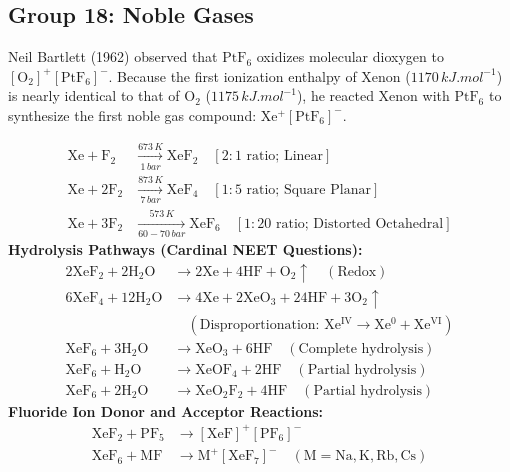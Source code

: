 \documentclass[10pt,twoside,openright]{book}
\begin{document}
\subsection{Group 18: Noble Gases}
Neil Bartlett (1962) observed that $\mathrm{PtF_6}$ oxidizes molecular dioxygen to $[\mathrm{O_2}]^+[\mathrm{PtF_6}]^-$. Because the first ionization enthalpy of Xenon ($1170\,\si{kJ.mol^{-1}}$) is nearly identical to that of $\mathrm{O_2}$ ($1175\,\si{kJ.mol^{-1}}$), he reacted Xenon with $\mathrm{PtF_6}$ to synthesize the first noble gas compound: $\mathrm{Xe^+[PtF_6]^-}$.

\begin{formulabox}
\begin{align}
  \mathrm{Xe} + \mathrm{F_2} &\xrightarrow[1\,\si{bar}]{673\,\si{K}} \mathrm{XeF_2} \quad [2:1\text{ ratio; Linear}] \\
  \mathrm{Xe} + 2\mathrm{F_2} &\xrightarrow[7\,\si{bar}]{873\,\si{K}} \mathrm{XeF_4} \quad [1:5\text{ ratio; Square Planar}] \\
  \mathrm{Xe} + 3\mathrm{F_2} &\xrightarrow[60-70\,\si{bar}]{573\,\si{K}} \mathrm{XeF_6} \quad [1:20\text{ ratio; Distorted Octahedral}]
\end{align}
\textbf{Hydrolysis Pathways (Cardinal NEET Questions):}
\begin{align}
  2\mathrm{XeF_2} + 2\mathrm{H_2O} &\longrightarrow 2\mathrm{Xe} + 4\mathrm{HF} + \mathbf{\mathrm{O_2\uparrow}} \quad (\text{Redox}) \\
  6\mathrm{XeF_4} + 12\mathrm{H_2O} &\longrightarrow 4\mathrm{Xe} + 2\mathbf{\mathrm{XeO_3}} + 24\mathrm{HF} + 3\mathbf{\mathrm{O_2\uparrow}} \\
  &\quad (\text{Disproportionation: } \mathrm{Xe^{IV}} \to \mathrm{Xe^0 + Xe^{VI}}) \\
  \mathrm{XeF_6} + 3\mathrm{H_2O} &\longrightarrow \mathbf{\mathrm{XeO_3}} + 6\mathrm{HF} \quad (\text{Complete hydrolysis}) \\
  \mathrm{XeF_6} + \mathrm{H_2O} &\longrightarrow \mathbf{\mathrm{XeOF_4}} + 2\mathrm{HF} \quad (\text{Partial hydrolysis}) \\
  \mathrm{XeF_6} + 2\mathrm{H_2O} &\longrightarrow \mathbf{\mathrm{XeO_2F_2}} + 4\mathrm{HF} \quad (\text{Partial hydrolysis})
\end{align}
\textbf{Fluoride Ion Donor and Acceptor Reactions:}
\begin{align}
  \mathrm{XeF_2} + \mathrm{PF_5} &\longrightarrow [\mathrm{XeF}]^+[\mathrm{PF_6}]^- \\
  \mathrm{XeF_6} + \mathrm{MF} &\longrightarrow \mathrm{M}^+[\mathrm{XeF_7}]^- \quad (\mathrm{M} = \mathrm{Na, K, Rb, Cs})
\end{align}
\end{formulabox}
\end{document}

